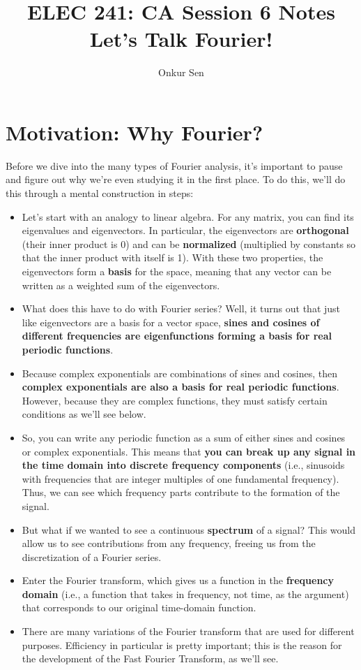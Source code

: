 \documentclass[11pt]{article}
\title{ELEC 241: CA Session 6 Notes\\Let's Talk Fourier!}
\author{Onkur Sen}
\date{}
\begin{document}
\maketitle

\section*{Motivation: Why Fourier?}
Before we dive into the many types of Fourier analysis, it's important to pause and figure out why we're even studying it in the first place. To do this, we'll do this through a mental construction in steps:

\begin{itemize}
\item Let's start with an analogy to linear algebra. For any matrix, you can find its eigenvalues and eigenvectors. In particular, the eigenvectors are {\bf orthogonal} (their inner product is 0) and can be {\bf normalized} (multiplied by constants so that the inner product with itself is 1). With these two properties, the eigenvectors form a {\bf basis} for the space, meaning that any vector can be written as a weighted sum of the eigenvectors.
\item What does this have to do with Fourier series? Well, it turns out that just like eigenvectors are a basis for a vector space, {\bf sines and cosines of different frequencies are eigenfunctions forming a basis for real periodic functions}.
\item Because complex exponentials are combinations of sines and cosines, then {\bf complex exponentials are also a basis for real periodic functions}. However, because they are complex functions, they must satisfy certain conditions as we'll see below.
\item So, you can write any periodic function as a sum of either sines and cosines or complex exponentials. This means that {\bf you can break up any signal in the time domain into discrete frequency components} (i.e., sinusoids with frequencies that are integer multiples of one fundamental frequency). Thus, we can see which frequency parts contribute to the formation of the signal.
\item But what if we wanted to see a continuous {\bf spectrum} of a signal? This would allow us to see contributions from any frequency, freeing us from the discretization of a Fourier series.
\item Enter the Fourier transform, which gives us a function in the {\bf frequency domain} (i.e., a function that takes in frequency, not time, as the argument) that corresponds to our original time-domain function.
\item There are many variations of the Fourier transform that are used for different purposes. Efficiency in particular is pretty important; this is the reason for the development of the Fast Fourier Transform, as we'll see.
\end{itemize}
\end{document}
